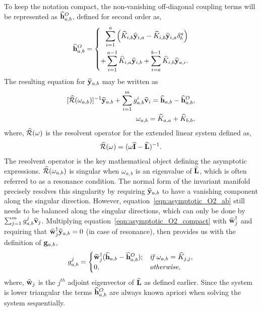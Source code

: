 To keep the notation compact, the non-vanishing off-diagonal coupling terms will be represented as $\widehat{\mathbf{h}}^{O}_{a,b}$, defined for second order as,
\begin{equation}
	\label{eqn:offdiagonal_O2}
	\widehat{\mathbf{h}}^{O}_{a,b} = \left\lbrace
	\begin{aligned}
		\sum^{a}_{i=1}\left(\widehat{K}_{i,b}\widehat{\mathbf{y}}_{i,a}   
		-\widehat{K}_{i,b}\widehat{\mathbf{y}}_{i,a}\delta^{a}_{b}\right) \\
		+	\sum^{a-1}_{i=1}\widehat{K}_{i,a}\widehat{\mathbf{y}}_{i,b} +
		\sum^{b-1}_{i=a}\widehat{K}_{i,b}\widehat{\mathbf{y}}_{a,i}.
	\end{aligned}\right. 
\end{equation}
The resulting equation for $\widehat{\mathbf{y}}_{a,b}$ may be written as
\begin{subequations}
	\label{eqn:asymptotic_O2_compact}
	\begin{align}
		[\widehat{\mathcal{R}}(\omega_{a,b})]^{-1}\widehat{\mathbf{y}}_{a,b} + \sum^{m}_{i=1}g^{i}_{a,b}\widehat{\mathbf{v}}_{i} 
		 = \widehat{\mathbf{h}}_{a,b} - \widehat{\mathbf{h}}^{O}_{a,b}, \\
		\omega_{a,b} = \widehat{K}_{a,a} + \widehat{K}_{b,b},
	\end{align}
\end{subequations}
where, $\widehat{\mathcal{R}}(\omega)$ is the resolvent operator for the extended linear system defined as,
\begin{align}
	\label{eqn:extended_resolvent}
	\widehat{\mathcal{R}}(\omega) = (\omega\mathbf{\widehat{I}} - \mathbf{\widehat{L}})^{-1}.
\end{align}
The resolvent operator is the key mathematical object defining the asymptotic expressions. $\widehat{\mathcal{R}}(\omega_{a,b})$ is singular when $\omega_{a,b}$ is an eigenvalue of $\mathbf{\widehat{L}}$, which is often referred to as a resonance condition. The normal form of the invariant manifold precisely resolves this singularity by requiring $\widehat{\mathbf{y}}_{a,b}$ to have a vanishing component along the singular direction. However, equation~\eqref{eqn:asymptotic_O2_ab} still needs to be balanced along the singular directions, which can only be done by $\sum^{m}_{j=1}g^{j}_{a,b}\widehat{\mathbf{v}}_{j}$. Multiplying equation~\eqref{eqn:asymptotic_O2_compact} with $\widehat{\mathbf{w}}_{j}^{\dagger}$ and requiring that $\widehat{\mathbf{w}}_{j}^{\dagger}\widehat{\mathbf{y}}_{a,b} = 0$ (in case of resonance), then provides us with the definition of $\mathbf{g}_{a,b}$,
\begin{equation}
	\label{eqn:g2_definition}
	g^{j}_{a,b} =
	\begin{cases}
				\widehat{\mathbf{w}}_{j}^{\dagger}(\widehat{\mathbf{h}}_{a,b} - \widehat{\mathbf{h}}^{O}_{a,b}); & \textit{if}\  \omega_{a,b} = \widehat{K}_{j,j},\\
				0,														& \textit{otherwise},
	\end{cases}
\end{equation}
where, $\widehat{\mathbf{w}}_{j}$ is the $j^{th}$ adjoint eigenvector of $\mathbf{\widehat{L}}$ as defined earlier. Since the system is lower triangular the terms $\widehat{\mathbf{h}}^{O}_{a,b}$ are always known apriori when solving the system sequentially. 

